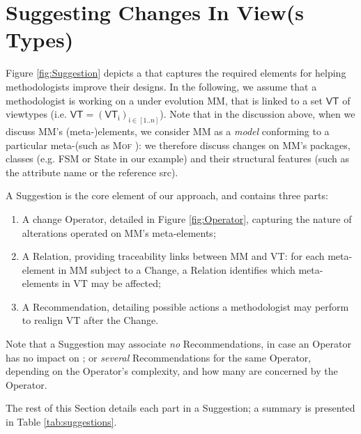 \section{Suggesting Changes In View(s Types)}
\label{sec:Suggestion}


Figure \ref{fig:Suggestion} depicts a \metamodel that captures the
required elements for helping methodologists improve their designs.
In the following, we assume that a methodologist is working on a \metamodel
under evolution \textsf{MM}, that is linked to a set $\mathsf{VT}$ of viewtypes
(i.e. $\mathsf{VT} = (\mathsf{VT}_\mathsf{i})_{\mathsf{i}\in [1..n]}$). Note that in the discussion above, when we discuss
\textsf{MM}'s (meta-)elements, we consider \textsf{MM} as a \emph{model}
conforming to a particular meta-\metamodel (such as \textsc{Mof} \cite{TR:OMG-MOF:2016}):
we therefore discuss changes on \textsf{MM}'s packages, classes (e.g. 
\textsf{FSM} or \textsf{State} in our example) and their structural features
(such as the attribute \textsf{name} or the reference \textsf{src}).

A \textsf{Suggestion} is the core element of our approach, and contains three 
parts:
\begin{enumerate}
    \item A change \textsf{Operator}, detailed in Figure \ref{fig:Operator}, capturing the nature of
alterations operated on \textsf{MM}'s meta-elements; 
    \item A \textsf{Relation}, providing traceability links between \textsf{MM} and \textsf{VT}: for each meta-element in \textsf{MM} subject to a \textsf{Change}, a \textsf{Relation}
identifies which meta-elements in \textsf{VT} may be affected;
    \item A \textsf{Recommendation}, detailing possible actions a methodologist may perform to realign \textsf{VT} after the \textsf{Change}. 
\end{enumerate}

Note that a \textsf{Suggestion} may 
associate \emph{no} \textsf{Recommendation}s, in case an \textsf{Operator} has no
impact on \viewtypes; or \emph{several} \textsf{Recommendation}s for the same 
\textsf{Operator}, depending on the \textsf{Operator}'s complexity, and how 
many \viewtypes are concerned by the \textsf{Operator}.

The rest of this Section details each part in a \textsf{Suggestion}; a summary
is presented in Table \ref{tab:suggestions}.







